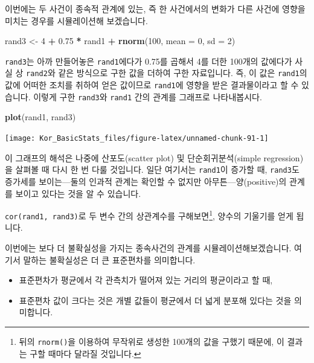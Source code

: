 \documentclass[]{book}
\newenvironment{Shaded}{\begin{snugshade}}{\end{snugshade}}
\newcommand{\DataTypeTok}[1]{\textcolor[rgb]{0.13,0.29,0.53}{#1}}
\newcommand{\DecValTok}[1]{\textcolor[rgb]{0.00,0.00,0.81}{#1}}
\newcommand{\FloatTok}[1]{\textcolor[rgb]{0.00,0.00,0.81}{#1}}
\newcommand{\KeywordTok}[1]{\textcolor[rgb]{0.13,0.29,0.53}{\textbf{#1}}}
\newcommand{\NormalTok}[1]{#1}
\newcommand{\OperatorTok}[1]{\textcolor[rgb]{0.81,0.36,0.00}{\textbf{#1}}}
\newcommand{\StringTok}[1]{\textcolor[rgb]{0.31,0.60,0.02}{#1}}
\providecommand{\tightlist}{%
  \setlength{\itemsep}{0pt}\setlength{\parskip}{0pt}}
\let\rmarkdownfootnote\footnote%
\def\footnote{\protect\rmarkdownfootnote}
\begin{document}
이번에는 두 사건이 종속적 관계에 있는, 즉 한 사건에서의 변화가 다른 사건에 영향을 미치는 경우를 시뮬레이션해 보겠습니다.

\begin{Shaded}
\begin{Highlighting}[]
\NormalTok{rand3 <-}\StringTok{ }\DecValTok{4} \OperatorTok{+}\StringTok{ }\FloatTok{0.75} \OperatorTok{*}\StringTok{ }\NormalTok{rand1 }\OperatorTok{+}\StringTok{ }\KeywordTok{rnorm}\NormalTok{(}\DecValTok{100}\NormalTok{, }\DataTypeTok{mean =} \DecValTok{0}\NormalTok{, }\DataTypeTok{sd =} \DecValTok{2}\NormalTok{)}
\end{Highlighting}
\end{Shaded}

\texttt{rand3}는 아까 만들어놓은 \texttt{rand1}에다가 0.75를 곱해서 4를 더한 100개의 값에다가 사실 상 \texttt{rand2}와 같은 방식으로 구한 값을 더하여 구한 자료입니다. 즉, 이 값은 \texttt{rand1}의 값에 어떠한 조치를 취하여 얻은 값이므로 \texttt{rand1}에 영향을 받은 결과물이라고 할 수 있습니다. 이렇게 구한 \texttt{rand3}와 \texttt{rand1} 간의 관계를 그래프로 나타내봅시다.

\begin{Shaded}
\begin{Highlighting}[]
\KeywordTok{plot}\NormalTok{(rand1, rand3)}
\end{Highlighting}
\end{Shaded}

\begin{center}\texttt{[image: Kor\_BasicStats\_files/figure-latex/unnamed-chunk-91-1]} \end{center}

이 그래프의 해석은 나중에 산포도(scatter plot) 및 단순회귀분석(simple regression)을 살펴볼 때 다시 한 번 다룰 것입니다. 일단 여기서는 \texttt{rand1}이 증가할 때, \texttt{rand3}도 증가세를 보이는---둘의 인과적 관계는 확인할 수 없지만 아무튼---양(positive)의 관계를 보이고 있다는 것을 알 수 있습니다.

\texttt{cor(rand1,\ rand3)}로 두 변수 간의 상관계수를 구해보면\footnote{뒤의 \texttt{rnorm()}을 이용하여 무작위로 생성한 100개의 값을 구했기 때문에, 이 결과는 구할 때마다 달라질 것입니다.}, 양수의 기울기를 얻게 됩니다.

이번에는 보다 더 불확실성을 가지는 종속사건의 관계를 시뮬레이션해보겠습니다. 여기서 말하는 불확실성은 더 큰 표준편차를 의미합니다.

\begin{itemize}
\tightlist
\item
  표준편차가 평균에서 각 관측치가 떨어져 있는 거리의 평균이라고 할 때,
\item
  표준편차 값이 크다는 것은 개별 값들이 평균에서 더 넓게 분포해 있다는 것을 의미합니다.
\end{itemize}
\end{document}
